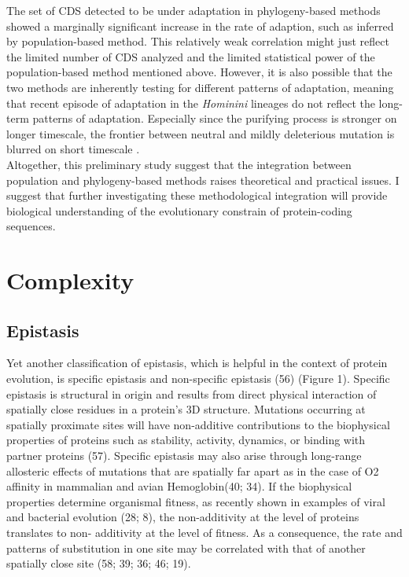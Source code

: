 The set of CDS detected to be under adaptation in phylogeny-based methods showed a marginally significant increase in the rate of adaption, such as inferred by population-based method. This relatively weak correlation might just reflect the limited number of CDS analyzed and the limited statistical power of the population-based method mentioned above. However, it is also possible that the two methods are inherently testing for different patterns of adaptation, meaning that recent episode of adaptation in the \textit{Hominini} lineages do not reflect the long-term patterns of adaptation. Especially since the purifying process is stronger on longer timescale, the frontier between neutral and mildly deleterious mutation is blurred on short timescale \cite{ho_time_2005}. \\

Altogether, this preliminary study suggest that the integration between population and phylogeny-based methods raises theoretical and practical issues. I suggest that further investigating these methodological integration will provide biological understanding of the evolutionary constrain of protein-coding sequences. \\


\section{Complexity}

\subsection{Epistasis}

Yet another classification of epistasis, which is helpful in the context of protein evolution,
is specific epistasis and non-specific epistasis (56) (Figure 1). Specific epistasis is structural in origin and results from direct physical interaction of spatially close residues in a protein’s 3D structure. Mutations occurring at spatially proximate sites will have non-additive contributions to the biophysical properties of proteins such as stability, activity, dynamics, or binding with partner proteins (57). Specific epistasis may also arise through long-range allosteric effects of mutations that are spatially far apart as in the case of O2 affinity in mammalian and avian Hemoglobin(40; 34). If the biophysical properties determine organismal fitness, as recently shown in examples of viral and bacterial evolution (28; 8), the non-additivity at the level of proteins translates to non- additivity at the level of fitness. As a consequence, the rate and patterns of substitution in one site may be correlated with that of another spatially close site (58; 39; 36; 46; 19).

